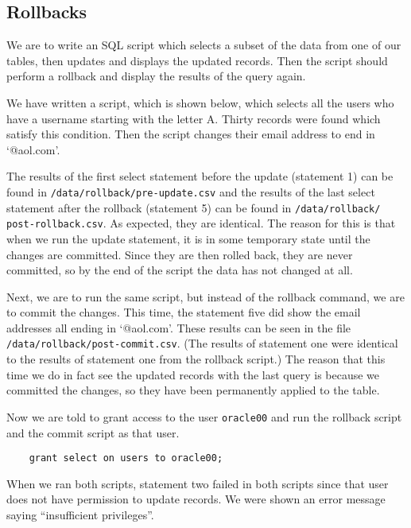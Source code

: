 \subsection{Rollbacks}

We are to write an SQL script which selects a subset of the data from one of our tables, then updates and displays the updated records. Then the script should perform a rollback and display the results of the query again.

We have written a script, which is shown below, which selects all the users who have a username starting with the letter A. Thirty records were found which satisfy this condition. Then the script changes their email address to end in `@aol.com'.


The results of the first select statement before the update (statement 1) can be found in \verb`/data/rollback/pre-update.csv` and the results of the last select statement after the rollback (statement 5) can be found in \verb`/data/rollback/` \verb`post-rollback.csv`. As expected, they are identical. The reason for this is that when we run the update statement, it is in some temporary state until the changes are committed. Since they are then rolled back, they are never committed, so by the end of the script the data has not changed at all.

Next, we are to run the same script, but instead of the rollback command, we are to commit the changes. This time, the statement five did show the email addresses all ending in `@aol.com'. These results can be seen in the file \verb`/data/rollback/post-commit.csv`. (The results of statement one were identical to the results of statement one from the rollback script.) The reason that this time we do in fact see the updated records with the last query is because we committed the changes, so they have been permanently applied to the table.

Now we are told to grant access to the user \verb`oracle00` and run the rollback script and the commit script as that user.

\begin{verbatim}
	grant select on users to oracle00;
\end{verbatim}

When we ran both scripts, statement two failed in both scripts since that user does not have permission to update records. We were shown an error message saying ``insufficient privileges''.